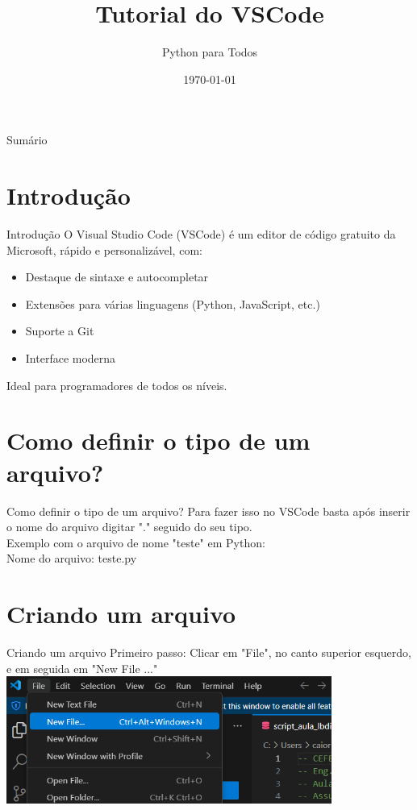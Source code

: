 \documentclass[fleqn,utf8,aspectratio=169,14pt]{beamer}
\title{Tutorial do VSCode}
\author{Python para Todos}
\date{\today}
\begin{document}
	

	\begin{frame}
		\titlepage
	\end{frame}
	

	\begin{frame}{Sumário}
		\tableofcontents
	\end{frame}
	

	\section{Introdução}
	\begin{frame}{Introdução}
		O Visual Studio Code (VSCode) é um editor de código gratuito da Microsoft, rápido e personalizável, com:
		\begin{itemize}
			\item Destaque de sintaxe e autocompletar
			\item Extensões para várias linguagens (Python, JavaScript, etc.)
			\item Suporte a Git
			\item Interface moderna
		\end{itemize}
		Ideal para programadores de todos os níveis.
	\end{frame}
	
	\section{Como definir o tipo de um arquivo?}
	\begin{frame}{Como definir o tipo de um arquivo?}
		Para fazer isso no VSCode basta após inserir o nome do arquivo digitar "." seguido do seu tipo.\\
		Exemplo com o arquivo de nome "teste" em Python:\\
		
			\centering  Nome do arquivo: teste.py
	\end{frame}

	\section{Criando um arquivo}
	\begin{frame}{Criando um arquivo}
		Primeiro passo:
		Clicar em "File", no canto superior esquerdo, e em seguida em "New File ..."
		\centering 
		\includegraphics[width=0.8\textwidth]{Imagem1.png}
	\end{frame}
	
\end{document}
